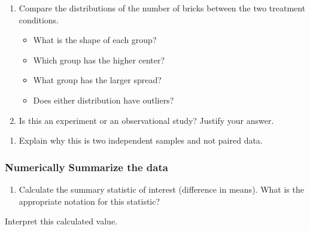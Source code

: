 \documentclass[
]{report}
\providecommand{\tightlist}{%
  \setlength{\itemsep}{0pt}\setlength{\parskip}{0pt}}
\begin{document}
\begin{enumerate}
\def\labelenumi{\arabic{enumi}.}
\item
  Compare the distributions of the number of bricks between the two treatment conditions.

  \begin{itemize}
  \item
    What is the shape of each group?
    \vspace{0.3in}
  \item
    Which group has the higher center?
    \vspace{0.3in}
  \item
    What group has the larger spread?
    \vspace{0.3in}
  \item
    Does either distribution have outliers?
    \vspace{.3in}
  \end{itemize}
\item
  Is this an experiment or an observational study? Justify your answer.
\end{enumerate}

\vspace{1in}

\begin{enumerate}
\def\labelenumi{\arabic{enumi}.}
\setcounter{enumi}{2}
\tightlist
\item
  Explain why this is two independent samples and not paired data.
  \vspace{1in}
\end{enumerate}

\subsubsection*{Numerically Summarize the data}\label{numerically-summarize-the-data}

\begin{enumerate}
\def\labelenumi{\arabic{enumi}.}
\setcounter{enumi}{3}
\tightlist
\item
  Calculate the summary statistic of interest (difference in means). What is the appropriate notation for this statistic?
\end{enumerate}

\vspace{0.5in}

Interpret this calculated value.

\vspace{0.6in}
\end{document}
